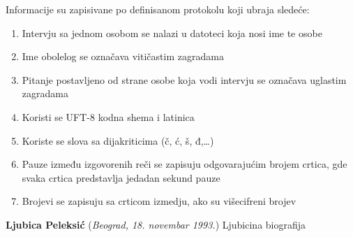 \documentclass[12pt,oneside]{memoir}
\begin{document}
Informacije su zapisivane po definisanom protokolu koji ubraja sledeće:

\begin{enumerate}
\item Intervju sa jednom osobom se nalazi u datoteci koja nosi ime te osobe
\item Ime obolelog se označava vitičastim zagradama 
\item Pitanje postavljeno od strane osobe koja vodi intervju se označava uglastim zagradama
\item Koristi se UFT-8 kodna shema i latinica
\item Koriste se slova sa dijakriticima (č, ć, š, đ,…)
\item Pauze između izgovorenih reči se zapisuju odgovarajućim brojem crtica, gde svaka crtica predstavlja jedadan sekund pauze
\item Brojevi se zapisuju sa crticom izmedju, ako su višecifreni brojev
\end{enumerate}


% 
\literatura

\backmatter


\begin{biografija}
  \textbf{Ljubica Peleksić} (\emph{Beograd,
    18.  novembar 1993.}) 
	Ljubicina biografija
\end{biografija}
\end{document}
